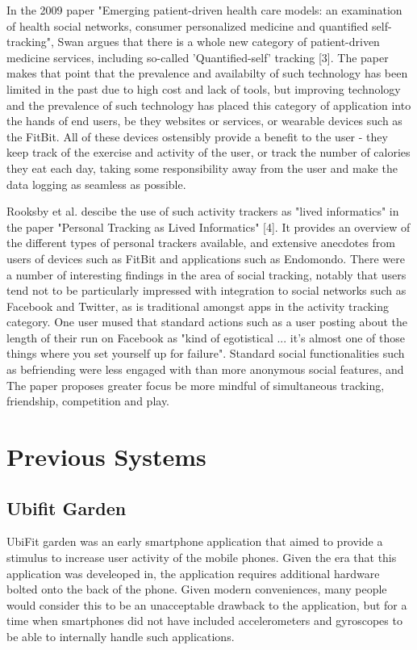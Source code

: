 \documentclass{l4proj}
\begin{document}
In the 2009 paper "Emerging patient-driven health care models: an examination of health social networks, consumer personalized medicine and quantified self-tracking", Swan argues that there is a whole new category of patient-driven medicine services, including so-called 'Quantified-self' tracking [3]. The paper makes that point that the prevalence and availabilty of such technology has been limited in the past due to high cost and lack of tools, but improving technology and the prevalence of such technology has placed this category of application into the hands of end users, be they websites or services, or wearable devices such as the FitBit. All of these devices ostensibly provide a benefit to the user - they keep track of the exercise and activity of the user, or track the number of calories they eat each day, taking some responsibility away from the user and make the data logging as seamless as possible. 

Rooksby et al. descibe the use of such activity trackers as "lived informatics" in the paper "Personal Tracking as Lived Informatics" [4]. It provides an overview of the different types of personal trackers available, and extensive anecdotes from users of devices such as FitBit and applications such as Endomondo. There were a number of interesting findings in the area of social tracking, notably that users tend not to be particularly impressed with integration to social networks such as Facebook and Twitter, as is traditional amongst apps in the activity tracking category. One user mused that standard actions such as a user posting about the length of their run on Facebook as "kind of egotistical ... it’s almost one of those things where you set yourself up for failure". Standard social functionalities such as befriending were less engaged with than more anonymous social features, and  The paper proposes greater focus be more mindful of simultaneous tracking, friendship, competition and play.

\section{Previous Systems}

\subsection{Ubifit Garden}

UbiFit garden was an early smartphone application that aimed to provide a stimulus to increase user activity of the mobile phones. Given the era that this application was develeoped in, the application requires additional hardware bolted onto the back of the phone. Given modern conveniences, many people would consider this to be an unacceptable drawback to the application, but for a time when smartphones did not have included accelerometers and gyroscopes to be able to internally handle such applications.
\end{document}
